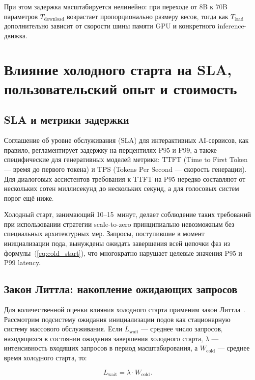При этом задержка масштабируется нелинейно: при переходе от 8B к 70B параметров $T_{\mathrm{download}}$ возрастает пропорционально размеру весов, тогда как $T_{\mathrm{load}}$ дополнительно зависит от скорости шины памяти GPU и конкретного inference-движка.

\section{Влияние холодного старта на SLA, пользовательский опыт и стоимость}

\subsection{SLA и метрики задержки}

Соглашение об уровне обслуживания (SLA) для интерактивных AI-сервисов, как правило, регламентирует задержку на перцентилях P95 и P99, а также специфические для генеративных моделей метрики: TTFT (Time to First Token --- время до первого токена) и TPS (Tokens Per Second --- скорость генерации). Для диалоговых ассистентов требования к TTFT на P95 нередко составляют от нескольких сотен миллисекунд до нескольких секунд, а для голосовых систем порог ещё ниже.

Холодный старт, занимающий 10--15~минут, делает соблюдение таких требований при использовании стратегии scale-to-zero принципиально невозможным без специальных архитектурных мер. Запросы, поступившие в момент инициализации пода, вынуждены ожидать завершения всей цепочки фаз из формулы~(\ref{eq:cold_start}), что многократно нарушает целевые значения P95 и P99 latency.

\subsection{Закон Литтла: накопление ожидающих запросов}

Для количественной оценки влияния холодного старта применим закон Литтла~\cite{little1961}. Рассмотрим подсистему ожидания инициализации подов как стационарную систему массового обслуживания. Если $L_{\mathrm{wait}}$ --- среднее число запросов, находящихся в состоянии ожидания завершения холодного старта, $\lambda$ --- интенсивность входящих запросов в период масштабирования, а $W_{\mathrm{cold}}$ --- среднее время холодного старта, то:

\begin{equation}
L_{\mathrm{wait}} = \lambda \cdot W_{\mathrm{cold}}.
\label{eq:little}
\end{equation}

